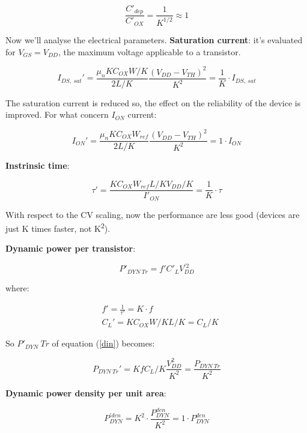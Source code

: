 \documentclass[a4paper, 12pt, twoside, openright]{report}
\newcommand{\super}{\textsuperscript}
\begin{document}
\begin{enumerate}
	\begin{equation}
	\frac{C'_{dep}}{C'_{OX}} = \frac{1}{K^{1/2}} \approx 1
	\label{}
	\end{equation}

Now we'll analyse the electrical parameters.
\textbf{Saturation current}: it's evaluated for $V_{GS} = V_{DD}$, the maximum voltage applicable to a transistor.

	\begin{equation}
	I_{DS,\ sat}' = \frac{\mu_n K C_{OX} W/K}{2 L/K}\frac{(V_{DD} - V_{TH})^2}{K^2} = \frac{1}{K} \cdot I_{DS,\ sat}
	\label{}
	\end{equation}

The saturation current is reduced so, the effect on the reliability of the device is improved. For what concern $I_{ON}$ current:

	\begin{equation}
	I_{ON}' = \frac{\mu_n K C_{OX} W_{ref}}{2 L/K}\frac{(V_{DD} - V_{TH})^2}{K^2} = 1 \cdot I_{ON}
	\end{equation}

\textbf{Instrinsic time}:

	\begin{equation}
	\tau ' = \frac{K C_{OX} W_{ref} L/K V_{DD}/K}{I'_{ON}} = \frac{1}{K} \cdot \tau
	\end{equation}

With respect to the CV scaling, now the performance are less good (devices are just K times faster, not K\super{2}).

\textbf{Dynamic power per transistor}:

	\begin{equation}
	P'_{DYN \ Tr} =f' C'_L V_{DD}^{'2}
	\label{din}
	\end{equation}

where:

	\begin{align}
	&f' = \frac{1}{\tau'} = K \cdot f \\
	&C_L ' = K C_{OX} W/K L/K = C_L/K
	\end{align}

So $P'_{DYN} \ Tr$ of equation (\ref{din}) becomes:

	\begin{equation}
	P_{DYN \ Tr}' =  K f C_L/K \frac{V_{DD}^2}{K^2} = \frac{P_{DYN \ Tr}}{K^2}
	\end{equation}

\textbf{Dynamic power density per unit area}:

	\begin{equation}
	P^{'den}_{DYN} = K^2 \cdot \frac{P^{den}_{DYN}}{K^2} = 1 \cdot P^{den}_{DYN}
	\end{equation}


\end{enumerate}
\end{document}
